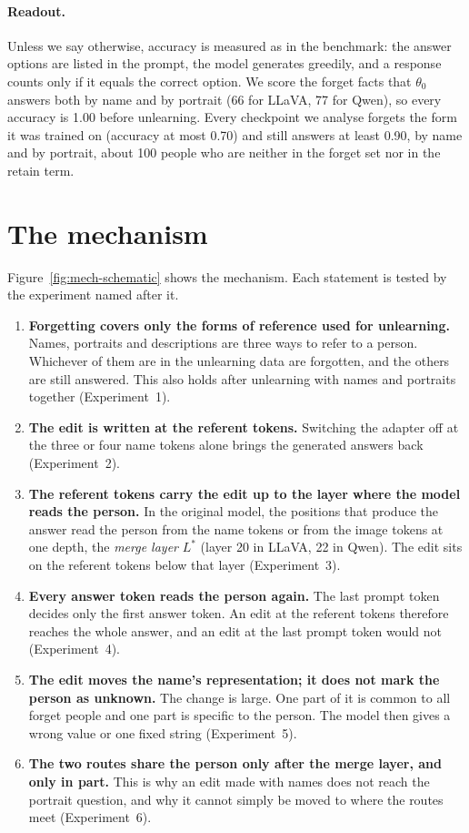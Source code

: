 \documentclass[11pt]{article}
\newcommand{\thorig}{\theta_0}
\newcommand{\Lmerge}{L^{*}}
\begin{document}
\paragraph{Readout.}
Unless we say otherwise, accuracy is measured as in the benchmark: the answer options are
listed in the prompt, the model generates greedily, and a response counts only if it equals
the correct option. We score the forget facts that $\thorig$ answers both by name and by portrait
(66 for LLaVA, 77 for Qwen), so every accuracy is 1.00 before unlearning. Every checkpoint we
analyse forgets the form it was trained on (accuracy at most 0.70) and still answers at least
0.90, by name and by portrait, about 100 people who are neither in the forget set nor in the
retain term.

\section{The mechanism}
\label{sec:mech-account}

Figure~\ref{fig:mech-schematic} shows the mechanism. Each statement is tested by the experiment
named after it.

\begin{enumerate}
\item \textbf{Forgetting covers only the forms of reference used for unlearning.} Names,
portraits and descriptions are three ways to refer to a person. Whichever of them are in the
unlearning data are forgotten, and the others are still answered. This also holds after
unlearning with names and portraits together (Experiment~1).
\item \textbf{The edit is written at the referent tokens.} Switching the adapter off at the
three or four name tokens alone brings the generated answers back (Experiment~2).
\item \textbf{The referent tokens carry the edit up to the layer where the model reads the
person.} In the original model, the positions that produce the answer read the person from
the name tokens or from the image tokens at one depth, the \emph{merge layer} $\Lmerge$ (layer 20
in LLaVA, 22 in Qwen). The edit sits on the referent tokens below that layer
(Experiment~3).
\item \textbf{Every answer token reads the person again.} The last prompt token decides only
the first answer token. An edit at the referent tokens therefore reaches the whole answer,
and an edit at the last prompt token would not (Experiment~4).
\item \textbf{The edit moves the name's representation; it does not mark the person as
unknown.} The change is large. One part of it is common to all forget people and one part is
specific to the person. The model then gives a wrong value or one fixed string
(Experiment~5).
\item \textbf{The two routes share the person only after the merge layer, and only in part.}
This is why an edit made with names does not reach the portrait question, and why it cannot
simply be moved to where the routes meet (Experiment~6).
\end{enumerate}
\end{document}
